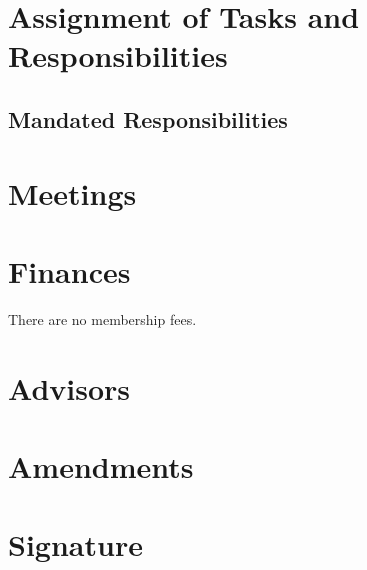 \documentclass{article}
\begin{document}
\section{Assignment of Tasks and Responsibilities}



\subsection{Mandated Responsibilities}


\section{Meetings}



\section{Finances}

There are no membership fees.


\section{Advisors}


\section{Amendments}


\section{Signature}
\end{document}
